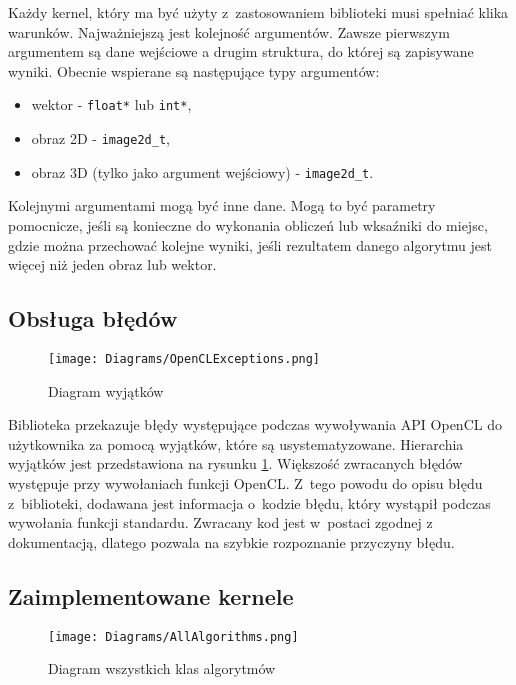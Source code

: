 Każdy kernel, który ma być użyty z~zastosowaniem biblioteki musi spełniać klika warunków. Najważniejszą jest kolejność argumentów. Zawsze pierwszym argumentem są dane wejściowe a drugim struktura, do której są zapisywane wyniki. Obecnie wspierane są następujące typy argumentów:
\begin{itemize}
\item wektor - \texttt{float*} lub \texttt{int*},
\item obraz 2D - \texttt{image2d_t},
\item obraz 3D (tylko jako argument wejściowy) - \texttt{image2d_t}.
\end{itemize}
Kolejnymi argumentami mogą być inne dane. Mogą to być parametry pomocnicze, jeśli są konieczne do wykonania obliczeń lub wksaźniki do miejsc, gdzie można przechować kolejne wyniki, jeśli rezultatem danego algorytmu jest więcej niż jeden obraz lub wektor.

\subsection{Obsługa błędów}
\label{subsec:obslugabledow}


\begin{figure}
\begin{center}
\texttt{[image: Diagrams/OpenCLExceptions.png]}
\end{center}
\caption{Diagram wyjątków}
\label{fig:diagramwyjatkow}
\end{figure}

Biblioteka przekazuje błędy występujące podczas wywoływania API OpenCL do użytkownika za pomocą wyjątków, które są usystematyzowane. Hierarchia wyjątków jest przedstawiona na rysunku \ref{fig:diagramwyjatkow}. Większość zwracanych błędów występuje przy wywołaniach funkcji OpenCL. Z~tego powodu do opisu błędu z~biblioteki, dodawana jest informacja o~kodzie błędu, który wystąpił podczas wywołania funkcji standardu. Zwracany kod jest w~postaci zgodnej z dokumentacją, dlatego pozwala na szybkie rozpoznanie przyczyny błędu.

\subsection{Zaimplementowane kernele}
\label{subsec:kernele}


\begin{figure}
\begin{center}
\texttt{[image: Diagrams/AllAlgorithms.png]}
\end{center}
\caption{Diagram wszystkich klas algorytmów}
\label{fig:diagramWszystko}
\end{figure}

